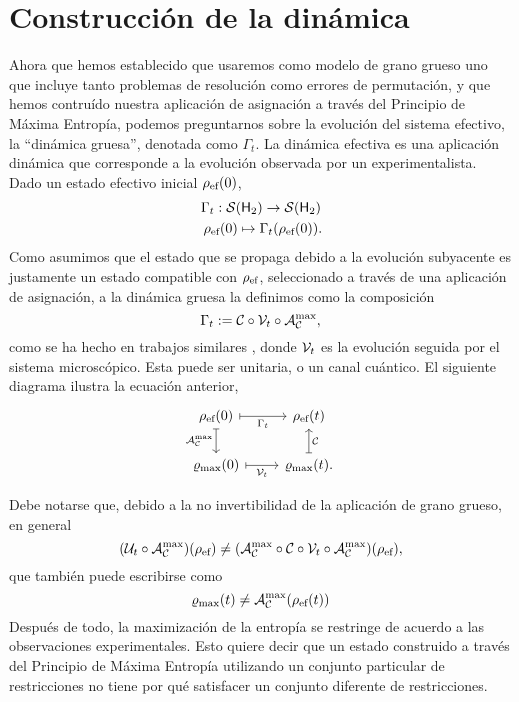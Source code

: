 \section{Construcción de la dinámica}\label{sec:ch2dycon}

Ahora que hemos establecido que usaremos como modelo de grano grueso uno que incluye tanto problemas de resolución como errores de permutación, y que hemos contruído nuestra aplicación de asignación a través del Principio de Máxima Entropía, podemos preguntarnos sobre la evolución del sistema efectivo, la ``dinámica gruesa'', denotada como $\Gamma_t$. La dinámica efectiva es una aplicación dinámica que corresponde a la evolución observada por un experimentalista. Dado un estado efectivo inicial $\rho_{\text{ef}}(0)$,
\begin{gather}
\Gamma_{t}:\mcS(\hilbert_2)\rightarrow \mcS(\hilbert_2)\nonumber\\
\rho_{\ef}(0) \mapsto \Gamma_{t}(\rho_{\ef}(0))\rlap{.}\nonumber
\end{gather}
Como asumimos que el estado que se propaga debido a la evolución subyacente es justamente un estado compatible con $\rho_{\text{ef}}$, seleccionado a través de una aplicación de asignación, a la dinámica gruesa la definimos como la composición
\begin{equation}\label{eq:EffectiveDynamics}
\Gamma_t:=\mathcal{C} \circ \mathcal{V}_t \circ \mathcal{A}_{\mathcal{C}}^{\max},
\end{equation}
como se ha hecho en trabajos similares \cite{CGEmergingDynamics}, donde $\mathcal{V}_{t}$ es la evolución seguida por el sistema microscópico. Esta puede ser unitaria, o un canal cuántico. El siguiente diagrama ilustra la ecuación anterior,
\[\begin{tikzcd}[arrows={<-|}]
    \rho_{\ef}(0)  & \rho_{\ef}(t) \arrow{l}{\Gamma_{t}} \arrow{d}{\mcC}\\
\varrho_{\max}(0) \arrow{u}{\mcA_{\mcC}^{\max}} & \varrho_{\max}(t). \arrow{l}{\mcV_{t}}
\end{tikzcd}
\]


Debe notarse que, debido a la no invertibilidad de la aplicación de grano grueso, en general
\begin{equation}
    (\mathcal{U}_{t}\circ\mathcal{A}_{\mathcal{C}}^{\max})(\rho_{\text{ef}}) \neq (\mathcal{A}_{\mathcal{C}}^{\max}\circ\mathcal{C} \circ \mathcal{V}_{t} \circ \mathcal{A}_{\mathcal{C}}^{\max})(\rho_{\text{ef}}),\nonumber
\end{equation}
que también puede escribirse como
\begin{equation}
    \varrho_{\max}(t)\neq\mathcal{A}_{\mathcal{C}}^{\max}(\rho_{\text{ef}}(t))\nonumber
\end{equation}
Después de todo, la maximización de la entropía se restringe de acuerdo a las observaciones experimentales. Esto quiere decir que un estado construido a través del Principio de Máxima Entropía utilizando un conjunto particular de restricciones no tiene por qué satisfacer un conjunto diferente de restricciones.

